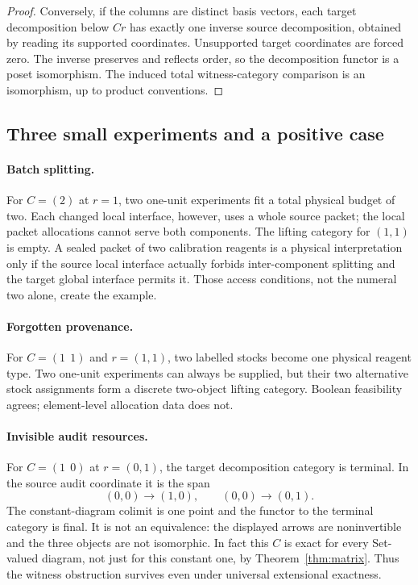 \begin{proof}
Conversely, if the columns are distinct basis vectors, each target
decomposition below $Cr$ has exactly one inverse source decomposition,
obtained by reading its supported coordinates. Unsupported target
coordinates are forced zero. The inverse preserves and reflects order,
so the decomposition functor is a poset isomorphism. The induced total
witness-category comparison is an isomorphism, up to product conventions.
\end{proof}

\subsection{Three small experiments and a positive case}
\paragraph{Batch splitting.}
For $C=(2)$ at $r=1$, two one-unit experiments fit a total physical budget
of two. Each changed local interface, however, uses a whole source packet;
the local packet allocations cannot serve both components. The lifting
category for $(1,1)$ is empty. A sealed packet of two calibration reagents
is a physical interpretation only if the source local interface actually
forbids inter-component splitting and the target global interface permits
it. Those access conditions, not the numeral two alone, create the example.

\paragraph{Forgotten provenance.}
For $C=(1\ \ 1)$ and $r=(1,1)$, two labelled stocks become one physical
reagent type. Two one-unit experiments can always be supplied, but their
two alternative stock assignments form a discrete two-object lifting
category. Boolean feasibility agrees; element-level allocation data does not.

\paragraph{Invisible audit resources.}
For $C=(1\ \ 0)$ at $r=(0,1)$, the target decomposition category is
terminal. In the source audit coordinate it is the span
\[
 (0,0)\longrightarrow(1,0),\qquad
 (0,0)\longrightarrow(0,1).
\]
The constant-diagram colimit is one point and the functor to the terminal
category is final. It is not an equivalence: the displayed arrows are
noninvertible and the three objects are not isomorphic. In fact this
$C$ is exact for every Set-valued diagram, not just for this constant one,
by Theorem~\ref{thm:matrix}. Thus the witness obstruction survives even
under universal extensional exactness.

